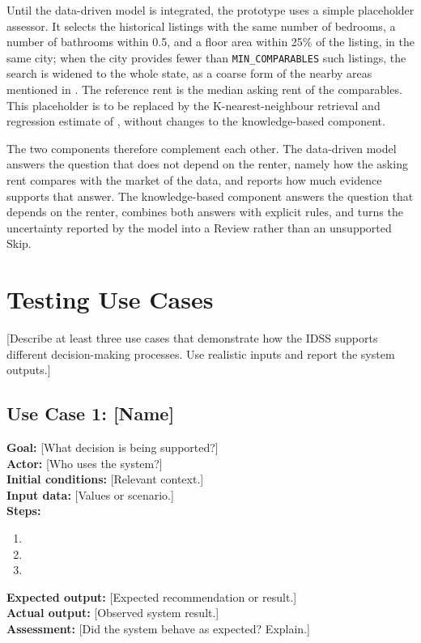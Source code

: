 \documentclass[12pt,a4paper]{report}
\begin{document}
Until the data-driven model is integrated, the prototype uses a simple
placeholder assessor. It selects the historical listings with the same
number of bedrooms, a number of bathrooms within 0.5, and a floor area
within 25\% of the listing, in the same city; when the city provides fewer
than \texttt{MIN\_COMPARABLES} such listings, the search is widened to the
whole state, as a coarse form of the nearby areas mentioned in
. The reference rent is the median asking rent of the
comparables. This placeholder is to be replaced by the K-nearest-neighbour
retrieval and regression estimate of , without
changes to the knowledge-based component.

The two components therefore complement each other. The data-driven model
answers the question that does not depend on the renter, namely how the
asking rent compares with the market of the data, and reports how much
evidence supports that answer. The knowledge-based component answers the
question that depends on the renter, combines both answers with explicit
rules, and turns the uncertainty reported by the model into a Review
rather than an unsupported Skip.

\chapter{Testing Use Cases}
\label{ch:usecases}

[Describe at least three use cases that demonstrate how the IDSS supports different decision-making processes. Use realistic inputs and report the system outputs.]

\section{Use Case 1: [Name]}
\textbf{Goal:} [What decision is being supported?]\\
\textbf{Actor:} [Who uses the system?]\\
\textbf{Initial conditions:} [Relevant context.]\\
\textbf{Input data:} [Values or scenario.]\\
\textbf{Steps:}
\begin{enumerate}
  \item [Step 1]
  \item [Step 2]
  \item [Step 3]
\end{enumerate}
\textbf{Expected output:} [Expected recommendation or result.]\\
\textbf{Actual output:} [Observed system result.]\\
\textbf{Assessment:} [Did the system behave as expected? Explain.]
\end{document}
